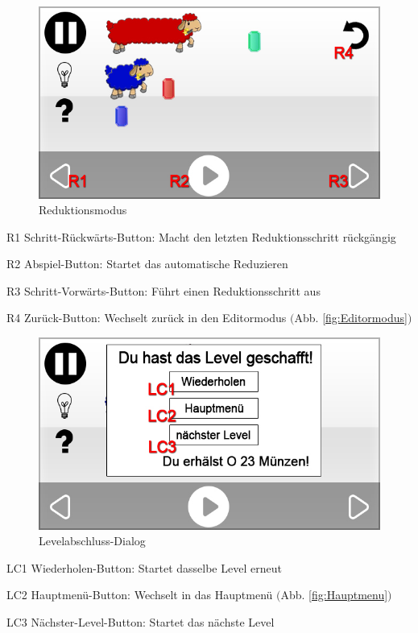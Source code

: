 
\begin{figure}[H]
\centering
\includegraphics[scale=0.55]{../gui/_jpeg_numeration/game_play_started.jpg}
\caption{Reduktionsmodus}
\label{fig:Reduktionsmodus}
\end{figure}
\begin{description*}
\item[R1] Schritt-Rückwärts-Button: Macht den letzten Reduktionsschritt rückgängig
\item[R2] Abspiel-Button: Startet das automatische Reduzieren
\item[R3] Schritt-Vorwärts-Button: Führt einen Reduktionsschritt aus
\item[R4] Zurück-Button: Wechselt zurück in den Editormodus $($Abb. \ref{fig:Editormodus}$)$
\end{description*}


\begin{figure}[H]
\centering
\includegraphics[scale=0.55]{../gui/_jpeg_numeration/game_completed.jpg}
\caption{Levelabschluss-Dialog}
\label{fig:Reduktionsmodus_Levelabschluss}
\end{figure}
\begin{description*}
\item[LC1] Wiederholen-Button: Startet dasselbe Level erneut
\item[LC2] Hauptmenü-Button: Wechselt in das Hauptmenü $($Abb. \ref{fig:Hauptmenu}$)$
\item[LC3] Nächster-Level-Button: Startet das nächste Level
\end{description*}

